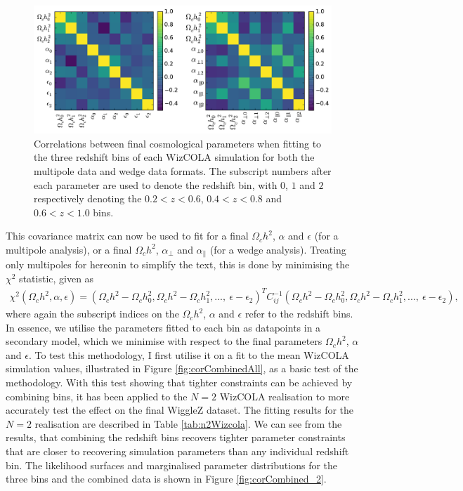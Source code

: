 \documentclass[titlesmallcaps, examinerscopy, copyrightpage]{uqthesis}
\begin{document}
\begin{figure}[h!]
  \begin{center}
    \includegraphics[width=\textwidth]{images/correlations.pdf}
  \end{center}
  \caption{Correlations between final cosmological parameters when fitting to the three redshift bins of each WizCOLA simulation for both the multipole data and wedge data formats. The subscript numbers after each parameter are used to denote the redshift bin, with $0$, $1$ and $2$ respectively denoting the $0.2 < z < 0.6$, $0.4 < z < 0.8$ and $0.6 < z < 1.0$ bins. }
  \label{fig:correlations}
\end{figure}

This covariance matrix can now be used to fit for a final $\Omega_c h^2$, $\alpha$ and $\epsilon$ (for a multipole analysis), or a final $\Omega_c h^2$, $\alpha_\perp$ and $\alpha_\parallel$ (for a wedge analysis). Treating only multipoles for hereonin to simplify the text, this is done by  minimising the $\chi^2$ statistic, given as
\begin{align} \label{eq:covchi}
\chi^2(\Omega_c h^2, \alpha, \epsilon) = (\Omega_c h^2 - \Omega_c h^2_0, \Omega_c h^2 - \Omega_c h^2_1, ...,\  \epsilon - \epsilon_2)^T C_{ij}^{-1}(\Omega_c h^2 - \Omega_c h^2_0, \Omega_c h^2 - \Omega_c h^2_1, ...,\  \epsilon - \epsilon_2),
\end{align}
where again the subscript indices on the $\Omega_c h^2$, $\alpha$ and $\epsilon$ refer to the redshift bins. In essence, we utilise the parameters fitted to each bin as datapoints in a secondary model, which we minimise with respect to the final parameters $\Omega_c h^2$, $\alpha$ and $\epsilon$. To test this methodology, I first utilise it on a fit to the mean WizCOLA simulation values, illustrated in Figure \ref{fig:corCombinedAll}, as a basic test of the methodology. With this test showing that tighter constraints can be achieved by combining bins, it has been applied to the $N=2$ WizCOLA realisation to more accurately test the effect on the final WiggleZ dataset.  The fitting results for the $N=2$ realisation are described in Table \ref{tab:n2Wizcola}. We can see from the results, that combining the redshift bins recovers tighter parameter constraints that are closer to recovering simulation parameters than any individual redshift bin. The likelihood surfaces and marginalised parameter distributions for the three bins and the combined data is shown in Figure \ref{fig:corCombined_2}.
\end{document}
